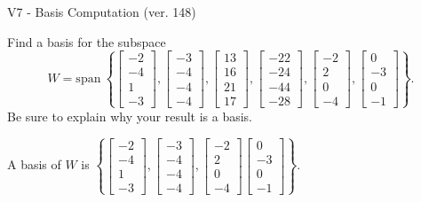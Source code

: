 \begin{exercise}
  \begin{exerciseTitle}V7 - Basis Computation (ver. 148)\end{exerciseTitle}
  \begin{exerciseStatement}
    Find a basis for the subspace 
\[W=\mathrm{span}\ \left\{\left[\begin{array}{r}
-2 \\
-4 \\
1 \\
-3
\end{array}\right] , \left[\begin{array}{r}
-3 \\
-4 \\
-4 \\
-4
\end{array}\right] , \left[\begin{array}{r}
13 \\
16 \\
21 \\
17
\end{array}\right] , \left[\begin{array}{r}
-22 \\
-24 \\
-44 \\
-28
\end{array}\right] , \left[\begin{array}{r}
-2 \\
2 \\
0 \\
-4
\end{array}\right] , \left[\begin{array}{r}
0 \\
-3 \\
0 \\
-1
\end{array}\right]\right\}.\]
 Be sure to explain why your result is a basis.


  \end{exerciseStatement}
  \begin{exerciseAnswer}
   A basis of \(W\) is  \(\left\{\left[\begin{array}{r}
-2 \\
-4 \\
1 \\
-3
\end{array}\right] , \left[\begin{array}{r}
-3 \\
-4 \\
-4 \\
-4
\end{array}\right] , \left[\begin{array}{r}
-2 \\
2 \\
0 \\
-4
\end{array}\right] \left[\begin{array}{r}
0 \\
-3 \\
0 \\
-1
\end{array}\right]\right\}\).
  


  \end{exerciseAnswer}
\end{exercise}